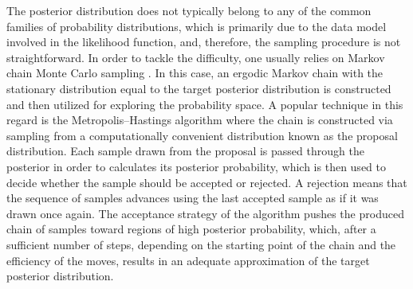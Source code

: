 The posterior distribution does not typically belong to any of the common
families of probability distributions, which is primarily due to the data model
involved in the likelihood function, and, therefore, the sampling procedure is
not straightforward. In order to tackle the difficulty, one usually relies on
Markov chain Monte Carlo sampling \cite{gelman2004}. In this case, an ergodic
Markov chain with the stationary distribution equal to the target posterior
distribution is constructed and then utilized for exploring the probability
space. A popular technique in this regard is the Metropolis--Hastings algorithm
where the chain is constructed via sampling from a computationally convenient
distribution known as the proposal distribution. Each sample drawn from the
proposal is passed through the posterior in order to calculates its posterior
probability, which is then used to decide whether the sample should be accepted
or rejected. A rejection means that the sequence of samples advances using the
last accepted sample as if it was drawn once again. The acceptance strategy of
the algorithm pushes the produced chain of samples toward regions of high
posterior probability, which, after a sufficient number of steps, depending on
the starting point of the chain and the efficiency of the moves, results in an
adequate approximation of the target posterior distribution.
